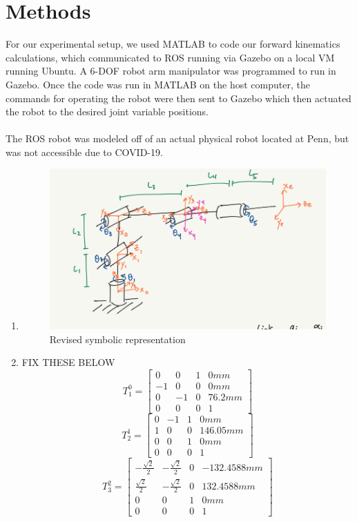 \documentclass[12pt]{article}
\begin{document}
\section{Methods}
For our experimental setup, we used MATLAB to code our forward kinematics calculations, which communicated to ROS running via Gazebo on a local VM running Ubuntu. A 6-DOF robot arm manipulator was programmed to run in Gazebo. Once the code was run in MATLAB on the host computer, the commands for operating the robot were then sent to Gazebo which then actuated the robot to the desired joint variable positions. \\ \\
The ROS robot was modeled off of an actual physical robot located at Penn, but was not accessible due to COVID-19.
\begin{enumerate}
\item \begin{figure} [h]
	\centering 
	\includegraphics[scale=1]{Q1.png}
	\caption{Revised symbolic representation}
	\end{figure}
\item FIX THESE BELOW
\begin{equation}
	T^{0}_{1} = \begin{bmatrix}
	0 & 0 & 1 & 0mm\\
	-1 & 0 & 0 & 0mm\\
	0 & -1 & 0 & 76.2mm\\
	0 & 0 & 0 & 1
	\end{bmatrix}
\end{equation}
\begin{equation}	
	T^{1}_{2} = \begin{bmatrix}
	0 & -1 & 1 & 0mm\\
	1 & 0 & 0 & 146.05mm\\
	0 & 0 & 1 & 0mm\\
	0 & 0 & 0 & 1
	\end{bmatrix}
\end{equation}
\begin{equation}	
	T^{2}_{3} = \begin{bmatrix}
	-\frac{\sqrt{2}}{2} & -\frac{\sqrt{2}}{2} & 0 & -132.4588mm\\
	\frac{\sqrt{2}}{2} & -\frac{\sqrt{2}}{2} & 0 & 132.4588mm\\
	0 & 0 & 1 & 0mm\\
	0 & 0 & 0 & 1
	\end{bmatrix}
\end{equation}


\end{enumerate}
\end{document}
